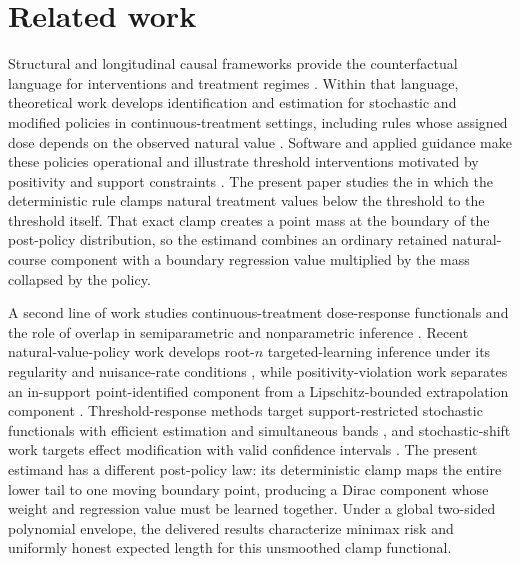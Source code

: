 \section{Related work}
\label{sec:related-work}

Structural and longitudinal causal frameworks provide the counterfactual language for interventions and treatment regimes \citep{Pearl2009,Robins2000,vanderLaan2003,vanderLaan2011}. Within that language, theoretical work develops identification and estimation for stochastic and modified policies in continuous-treatment settings, including rules whose assigned dose depends on the observed natural value \citep{Diaz2012,Haneuse2013,Young2014,DiazWilliamsHoffmanSchenck2023}. Software and applied guidance make these policies operational and illustrate threshold interventions motivated by positivity and support constraints \citep{WilliamsDiaz2023lmtp,HoffmanSalazarBarretoWilliamsRudolphDiaz2024}. The present paper studies the  in which the deterministic rule clamps natural treatment values below the threshold to the threshold itself. That exact clamp creates a point mass at the boundary of the post-policy distribution, so the estimand combines an ordinary retained natural-course component with a boundary regression value multiplied by the mass collapsed by the policy.

A second line of work studies continuous-treatment dose-response functionals and the role of overlap in semiparametric and nonparametric inference \citep{Imbens2000,Hirano2005,Imai2004,KennedyMaMcHughSmall2017,BonviniKennedy2026}. Recent natural-value-policy work develops root-\(n\) targeted-learning inference under its regularity and nuisance-rate conditions \citep{Diaz2026}, while positivity-violation work separates an in-support point-identified component from a Lipschitz-bounded extrapolation component \citep{Koo2026}. Threshold-response methods target support-restricted stochastic functionals with efficient estimation and simultaneous bands \citep{vanderLaanZhangGilbert2023}, and stochastic-shift work targets effect modification with valid confidence intervals \citep{McCoyZhangHubbardvanderLaanSchuler2026}. The present estimand has a different post-policy law: its deterministic clamp maps the entire lower tail to one moving boundary point, producing a Dirac component whose weight and regression value must be learned together. Under a global two-sided polynomial envelope, the delivered results characterize minimax risk and uniformly honest expected length for this unsmoothed clamp functional.

